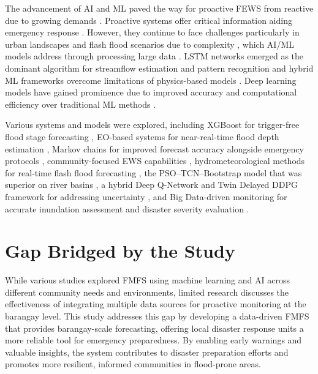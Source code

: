 \documentclass{research}
\begin{document}
The advancement of AI and ML paved the way for proactive FEWS from reactive \cite{alrawas2024critical,piadeh2022critical} due to growing demands \cite{fernandeznovoa2024enhancing,hossoda2025datadriven,oddo2024deep}. Proactive systems offer critical information aiding emergency response \cite{lee2023maxfloodcast,alasali2021sustainable,najafi2024high}. However, they continue to face challenges particularly in urban landscapes \cite{hofmann2020risk,lee2020integrated,palash2024datadriven} and flash flood scenarios due to complexity \cite{soares2025ml4ff}, which AI/ML models address through processing large data \cite{demelo2024early,zlopasa2024leveraging}. LSTM networks emerged as the dominant algorithm for streamflow estimation and pattern recognition \cite{kuhaneswaran2025evolution,nevo2022flood,khan2025development,aravamudan2025superresolution} and hybrid ML frameworks overcome limitations of physics-based models \cite{li2024optimizing,refadah2025development}. Deep learning models have gained prominence due to improved accuracy and computational efficiency over traditional ML methods \cite{situ2024improving,yi2024reservoir}.

Various systems and models were explored, including XGBoost for trigger-free flood stage forecasting \cite{sanders2022datadriven}, EO-based systems for near-real-time flood depth estimation \cite{destefanis2025advancing}, Markov chains for improved forecast accuracy alongside emergency protocols \cite{bibbo2025flood}, community-focused EWS capabilities \cite{cheong2024development}, hydrometeorological methods for real-time flash flood forecasting \cite{troselj2023realtime}, the PSO--TCN--Bootstrap model that was superior on river basins \cite{yu2025research}, a hybrid Deep Q-Network and Twin Delayed DDPG framework for addressing uncertainty \cite{rashid2024realtime}, and Big Data-driven monitoring for accurate inundation assessment and disaster severity evaluation \cite{hou2025development}.

\section{Gap Bridged by the Study}

While various studies explored FMFS using machine learning and AI across different community needs and environments, limited research discusses the effectiveness of integrating multiple data sources for proactive monitoring at the barangay level. This study addresses this gap by developing a data-driven FMFS that provides barangay-scale forecasting, offering local disaster response units a more reliable tool for emergency preparedness. By enabling early warnings and valuable insights, the system contributes to disaster preparation efforts and promotes more resilient, informed communities in flood-prone areas.
\end{document}
